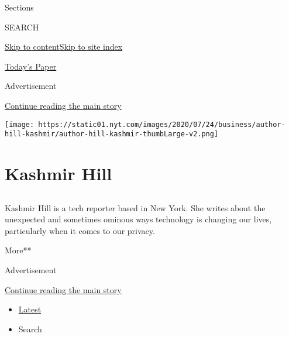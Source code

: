 Sections

SEARCH

\protect\hyperlink{site-content}{Skip to
content}\protect\hyperlink{site-index}{Skip to site index}

\href{https://myaccount.nytimes.com/auth/login?response_type=cookie\&client_id=vi}{}

\href{https://www.nytimes.com/section/todayspaper}{Today's Paper}

Advertisement

\protect\hyperlink{after-top}{Continue reading the main story}

\texttt{[image: https://static01.nyt.com/images/2020/07/24/business/author-hill-kashmir/author-hill-kashmir-thumbLarge-v2.png]}

\hypertarget{kashmir-hill}{%
\section{Kashmir Hill}\label{kashmir-hill}}

\subsection{}

Kashmir Hill is a tech reporter based in New York. She writes about the
unexpected and sometimes ominous ways technology is changing our lives,
particularly when it comes to our privacy.

More**

Advertisement

\protect\hyperlink{after-mid1}{Continue reading the main story}

\begin{itemize}
\tightlist
\item
  \protect\hyperlink{stream-panel}{Latest}
\item
  Search
\end{itemize}


